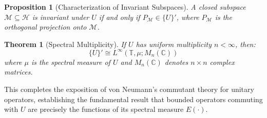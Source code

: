 \documentclass{article}
\newcommand{\cdummy}{\cdot}
\newtheorem{proposition}{Proposition}
\newtheorem{theorem}{Theorem}
\begin{document}
\begin{proposition}
  [Characterization of Invariant Subspaces] A closed subspace $\mathcal{M}
  \subseteq \mathcal{H}$ is invariant under $U$ if and only if
  $P_{\mathcal{M}} \in \{U\}'$, where $P_{\mathcal{M}}$ is the orthogonal
  projection onto $\mathcal{M}$.
\end{proposition}

\begin{theorem}
  [Spectral Multiplicity] If $U$ has uniform multiplicity $n < \infty$, then:
  \begin{equation}
    \{U\}' \cong L^{\infty} (\mathbb{T}, \mu ; M_n (\mathbb{C}))
  \end{equation}
  where $\mu$ is the spectral measure of $U$ and $M_n (\mathbb{C})$ denotes $n
  \times n$ complex matrices.
\end{theorem}

This completes the exposition of von Neumann's commutant theory for unitary
operators, establishing the fundamental result that bounded operators
commuting with $U$ are precisely the functions of its spectral measure $E
(\cdummy)$.
\end{document}
